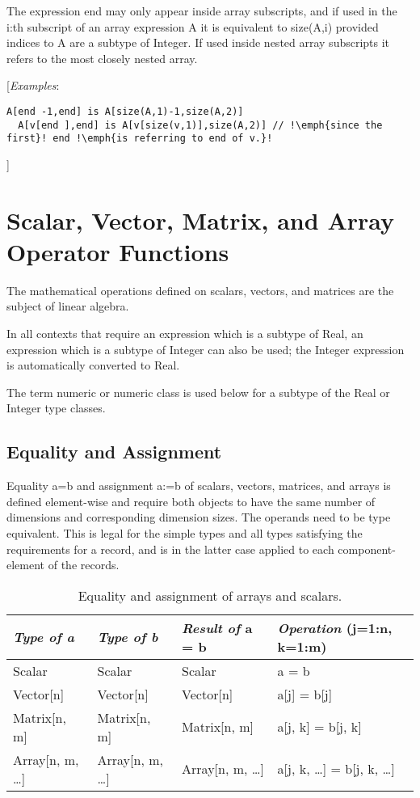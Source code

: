 The expression end may only appear inside array subscripts, and if used
in the i:th subscript of an array expression A it is equivalent to
size(A,i) provided indices to A are a subtype of Integer. If used inside
nested array subscripts it refers to the most closely nested array.

{[}\emph{Examples}:

\begin{lstlisting}[language=modelica, escapechar=!]
  A[end -1,end] is A[size(A,1)-1,size(A,2)]
  A[v[end ],end] is A[v[size(v,1)],size(A,2)] // !\emph{since the first}! end !\emph{is referring to end of v.}!
\end{lstlisting}
{]}

\section{Scalar, Vector, Matrix, and Array Operator Functions}

The mathematical operations defined on scalars, vectors, and matrices
are the subject of linear algebra.

In all contexts that require an expression which is a subtype of Real,
an expression which is a subtype of Integer can also be used; the
Integer expression is automatically converted to Real.

The term numeric or numeric class is used below for a subtype of the
Real or Integer type classes.

\subsection{Equality and Assignment}

Equality a=b and assignment a:=b of scalars, vectors, matrices, and
arrays is defined element-wise and require both objects to have the same
number of dimensions and corresponding dimension sizes. The operands
need to be type equivalent. This is legal for the simple types and all
types satisfying the requirements for a record, and is in the latter
case applied to each component-element of the records.

\begin{longtable}[]{|l|l|l|l|}
\caption{Equality and assignment of arrays and scalars.}\\
\hline
\emph{Type of a} & \emph{Type of b} & \emph{Result of} a = b & \emph{Operation} (j=1:n, k=1:m)\\ \hline
\endhead
Scalar & Scalar & Scalar & a = b\\ \hline
Vector{[}n{]} & Vector{[}n{]} & Vector{[}n{]} & a{[}j{]} =
b{[}j{]}\\ \hline
Matrix{[}n, m{]} & Matrix{[}n, m{]} & Matrix{[}n, m{]} & a{[}j, k{]} =
b{[}j, k{]}\\ \hline
Array{[}n, m, \ldots{}{]} & Array{[}n, m, \ldots{}{]} & Array{[}n, m,
\ldots{}{]} & a{[}j, k, \ldots{}{]} = b{[}j, k,
\ldots{}{]}\\ \hline
\end{longtable}

